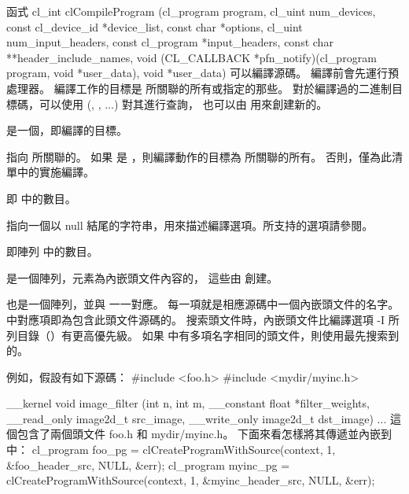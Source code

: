 函式
\startclc
cl_int clCompileProgram (cl_program program,
			cl_uint num_devices,
			const cl_device_id *device_list,
			const char *options,
			cl_uint num_input_headers,
			const cl_program *input_headers,
			const char **header_include_names,
			void (CL_CALLBACK *pfn_notify)(cl_program program,
					void *user_data),
			void *user_data)
\stopclc
可以編譯源碼。
編譯前會先運行預處理器。
編譯工作的目標是  所關聯的所有或指定的那些。
對於編譯過的二進制目標碼，可以使用 (, , ...) 對其進行查詢，
也可以由  用來創建新的。

 是一個，即編譯的目標。

 指向  所關聯的。
如果  是 ，則編譯動作的目標為  所關聯的所有。
否則，僅為此清單中的實施編譯。

 即  中的數目。

 指向一個以 null 結尾的字符串，用來描述編譯選項。所支持的選項請參閱。

 即陣列  中的數目。

 是一個陣列，元素為內嵌頭文件內容的，
這些由  創建。

 也是一個陣列，並與  一一對應。
每一項就是相應源碼中一個內嵌頭文件的名字。
  中對應項即為包含此頭文件源碼的。
搜索頭文件時，內嵌頭文件比編譯選項 -I 所列目錄（）有更高優先級。
如果  中有多項名字相同的頭文件，則使用最先搜索到的。

例如，假設有如下源碼：
\startclc
#include <foo.h>
#include <mydir/myinc.h>

__kernel void image_filter (int n, int m,
			__constant float *filter_weights,
			__read_only image2d_t src_image,
			__write_only image2d_t dst_image)
{
	...
}
\stopclc
這個包含了兩個頭文件 foo.h 和 mydir/myinc.h。
下面來看怎樣將其傳遞並內嵌到中：
\startclc
cl_program foo_pg = clCreateProgramWithSource(context,
				1, &foo_header_src, NULL, &err);
cl_program myinc_pg = clCreateProgramWithSource(context,
				1, &myinc_header_src, NULL, &err);

